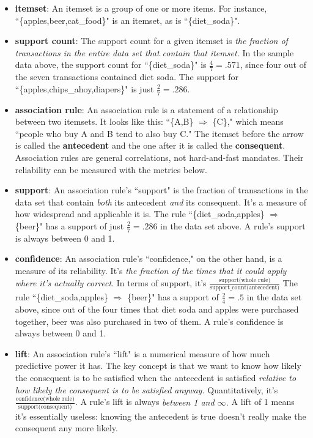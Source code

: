 \documentclass[12pt]{article}
\begin{document}
\begin{itemize}
\itemsep.1em

\item \textbf{itemset}: An itemset is a group of one or more items. For
instance, ``\{apples,beer,cat\_food\}" is an itemset, as is ``\{diet\_soda\}".

\item \textbf{support count}: The support count for a given itemset is
\textit{the fraction of transactions in the entire data set that contain that
itemset.} In the sample data above, the support count for ``\{diet\_soda\}" is
$\frac{4}{7} = .571$, since four out of the seven transactions contained
diet soda. The support for ``\{apples,chips\_ahoy,diapers\}" is just $\frac{2}{7}
= .286$.

\item \textbf{association rule}: An association rule is a statement of a
relationship between two itemsets. It looks like this: ``\{A,B\} $\Rightarrow$
\{C\}," which means ``people who buy A and B tend to also buy C." The itemset
before the arrow is called the \textbf{antecedent} and the one after it is
called the \textbf{consequent}. Association
rules are general correlations, not hard-and-fast mandates. Their reliability
can be measured with the metrics below.

\item \textbf{support}: An association rule's ``support" is the fraction of
transactions in the data set that contain \textit{both} its antecedent
\textit{and} its consequent. It's a measure of how widespread and applicable
it is. The rule ``\{diet\_soda,apples\} $\Rightarrow$ \{beer\}" has a support of
just $\frac{2}{7} = .286$ in the data set above. A rule's support is always
between 0 and 1.

\item \textbf{confidence}: An association rule's ``confidence," on the other
hand, is a measure of its reliability. It's \textit{the fraction of the times
that it could apply where it's actually correct}. In terms of support, it's
$\frac{\textrm{support(whole rule)}}{\textrm{support\_count(antecedent)}}$
The rule ``\{diet\_soda,apples\} $\Rightarrow$ \{beer\}" has a support of
$\frac{2}{4} = .5$ in the data set above, since out of the four times that
diet soda and apples were purchased together, beer was also purchased in two
of them. A rule's confidence is always between 0 and 1.

\item \textbf{lift}: An association rule's ``lift" is a numerical measure of
how much predictive power it has. The key concept is that we want to know how
likely the consequent is to be satisfied when the antecedent is satisfied 
\textit{relative to how likely the consequent is to be satisfied anyway.}
Quantitatively, it's $\frac{\textrm{confidence(whole
rule)}}{\textrm{support(consequent)}}$. A rule's lift is always \textit{between 1 and
$\infty$.} A lift of 1 means it's essentially useless: knowing the antecedent
is true doesn't really make the consequent any more likely.
\end{itemize}
\end{document}
